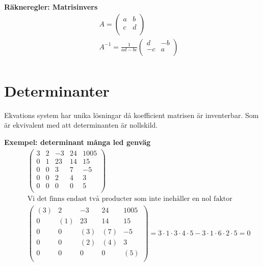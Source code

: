 \textbf{Räkneregler: Matrisinvers }
\begin{align*}
  &\quad  A =
  \left(\begin{array}{cc}
    a & b  \\
    c & d  \\
  \end{array}\right) \\
  &\quad  A^{-1} = \frac{1}{ad-bc} 
  \left(\begin{array}{cc}
    d  & -b  \\
    -c & a  \\
  \end{array}\right) \\
\end{align*}


\newpage

\section{Determinanter}
Ekvations system har unika lösningar då koefficient matrisen är inventerbar.
Som är ekvivalent med att determinanten är nollskild.

\textbf{Exempel: determinant många led genväg }
\begin{align*}
  &\quad  
  \left(\begin{array}{ccccc}
    3 & 2 & -3 & 24 & 1005 \\
    0 & 1 & 23 & 14 & 15 \\
    0 & 0 & 3  & 7  & -5 \\
    0 & 0 & 2  & 4  & 3 \\
    0 & 0 & 0  & 0  & 5 \\
  \end{array}\right) \\
  &\quad \text{Vi det finns endast två producter som inte inehåller en nol faktor} \\
  &\quad
  \left(\begin{array}{ccccc}
    (3) & 2 & -3 & 24 & 1005 \\
    0 & (1) & 23 & 14 & 15 \\
    0 & 0 & (3)  & (7)  & -5 \\
    0 & 0 & (2)  & (4)  & 3 \\
    0 & 0 & 0  & 0  & (5) \\
  \end{array}\right) = 3\cdot{1}\cdot{3}\cdot{4}\cdot{5}-3\cdot{1}\cdot{6}\cdot{2}\cdot{5}=0
\end{align*}


